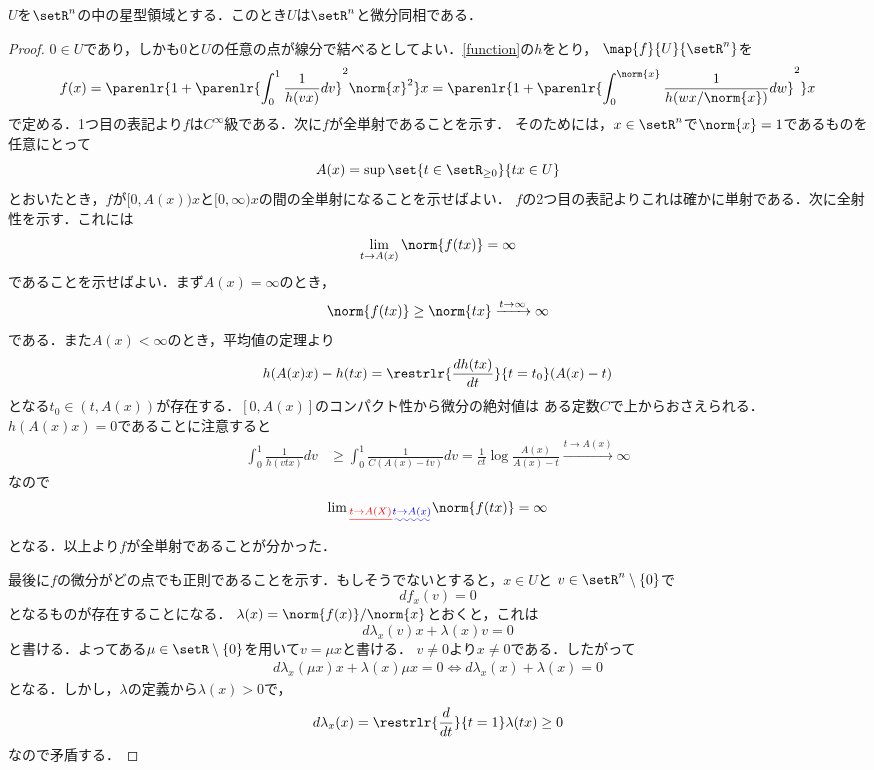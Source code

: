 \documentclass[uplatex]{jsarticle}
\providecommand{\DIFadd}[1]{{\protect\color{blue}\uwave{#1}}} %
\providecommand{\DIFdel}[1]{{\protect\color{red}\sout{#1}}}                      %
\providecommand{\DIFaddbegin}{} %
\providecommand{\DIFaddend}{} %
\providecommand{\DIFdelbegin}{} %
\providecommand{\DIFdelend}{} %
\begin{document}
\begin{proposition}
  $U$を$\setR^n$の中の星型領域とする．このとき$U$は$\setR^n$と微分同相である．
\end{proposition}

\begin{proof}
  $0\in U$であり，しかも0と$U$の任意の点が線分で結べるとしてよい．\cref{function}の$h$をとり，
  $\map{f}{U}{\setR^n}$を
    \[f(x)=\parenlr{1+\parenlr{\int_0^1 \frac{1}{h(vx)}dv}^2\norm{x}^2}x
    =\parenlr{1+\parenlr{\int_0^{\norm{x}}\frac{1}{h(wx/\norm{x})}dw }^2 }x \]
  で定める．1つ目の表記より$f$は$C^\infty$級である．次に$f$が全単射であることを示す．
  そのためには，$x\in \setR^n$で$\norm{x}=1$であるものを任意にとって
    \[A(x)=\sup\set{t\in \setR_{\geq0}}{tx\in U}\]
  とおいたとき，$f$が$[0, A(x))x$と$[0,\infty)x$の間の全単射になることを示せばよい．
  $f$の2つ目の表記よりこれは確かに単射である．次に全射性を示す．これには
    \[\lim_{t\to A(x)} \norm{f(tx)} = \infty \]
  であることを示せばよい．まず$A(x)=\infty$のとき，
    \[\norm{f(tx)} \geq \norm{tx} \xrightarrow{t\to \infty} \infty \]
  である．また$A(x)< \infty$のとき，平均値の定理より
    \[h(A(x)x)-h(tx)=\restrlr{\frac{dh(tx)}{dt}}{t=t_0} (A(x)-t) \]
  となる$t_0\in (t, A(x))$が存在する．$[0,A(x)]$のコンパクト性から微分の絶対値は
  ある定数$C$で上からおさえられる．$h(A(x)x)=0$であることに注意すると
  \begin{align*}
    \int_0^1 \frac{1}{h(vtx)}dv&\geq \int_0^1 \frac{1}{C(A(x)-tv)}dv
    =\frac{1}{ct}\log\frac{A(x)}{A(x)-t}\xrightarrow{t\to A(x)} \infty
  \end{align*}
  なので
    \[\lim\DIFdelbegin \DIFdel{_{t\to A(X)} }\DIFdelend \DIFaddbegin \DIFadd{_{t\to A(x)} }\DIFaddend \norm{f(tx)}=\infty \]
  となる．以上より$f$が全単射であることが分かった．

  最後に$f$の微分がどの点でも正則であることを示す．もしそうでないとすると，$x\in U$と
  $v\in \setR^n\setminus\{0\}$で
    \[df_x(v) = 0\]
  となるものが存在することになる．
  $\lambda(x) = \norm{f(x)}/\norm{x}$とおくと，これは
    \[d\lambda_x(v)x+\lambda(x)v = 0 \]
  と書ける．よってある$\mu \in \setR\setminus\{0\}$を用いて$v = \mu x$と書ける．
  $v\neq 0$より$x\neq 0$である．したがって
  \begin{align*}
    d\lambda_x(\mu x)x+\lambda(x)\mu x=0 \iff d\lambda_x(x)+\lambda(x)=0
  \end{align*}
  となる．しかし，$\lambda$の定義から$\lambda(x)>0$で，
    \[d\lambda_x(x)=\restrlr{\frac{d}{dt}}{t=1}\lambda(tx)\geq 0\]
  なので矛盾する．
\end{proof}
\end{document}
